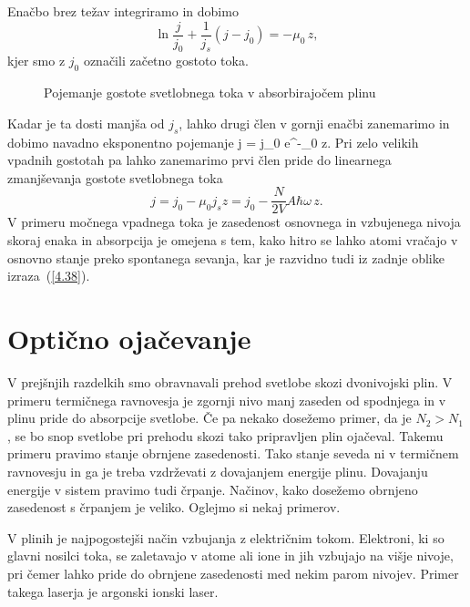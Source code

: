 Enačbo brez težav integriramo in dobimo 
\begin{equation}
\ln\frac{j}{j_{0}}+\frac{1}{j_{s}}(j-j_{0})=-\mu_{0}\, z,\label{4.37}
\end{equation}
kjer smo z $j_{0}$ označili začetno gostoto toka. 

\begin{figure}[h]
\centering
\def\svgwidth{90truemm} 

\caption{Pojemanje gostote svetlobnega toka v absorbirajočem plinu}
\label{fig:abs2}
\end{figure}

Kadar je ta dosti
manjša od $j_{s}$, lahko drugi člen v gornji enačbi zanemarimo in dobimo 
navadno eksponentno pojemanje
\beq
j = j_0 e^{-\mu_0 z}.
\eeq
Pri zelo velikih vpadnih gostotah pa lahko zanemarimo prvi člen pride do 
linearnega zmanjševanja gostote svetlobnega toka
\begin{equation}
j=j_{0}-\mu_{0}j_{s}z=j_{0}-\frac{N}{2V}A\hbar\omega\, z.
\label{4.38}
\end{equation}
V primeru močnega vpadnega toka je zasedenost osnovnega in vzbujenega nivoja skoraj
enaka in absorpcija je omejena s tem, kako hitro se lahko atomi vračajo
v osnovno stanje preko spontanega sevanja, kar je razvidno tudi iz
zadnje oblike izraza~(\ref{4.38}).

\section{Optično ojačevanje}
V prejšnjih razdelkih smo obravnavali prehod svetlobe skozi dvonivojski plin. V primeru
termičnega ravnovesja je zgornji nivo manj zaseden od spodnjega in v plinu pride
do absorpcije svetlobe. Če pa nekako dosežemo primer, da je $N_{2}>N_{1}$, 
se bo snop svetlobe pri prehodu skozi tako pripravljen plin ojačeval. 
Takemu primeru pravimo stanje obrnjene zasedenosti. 
Tako stanje seveda ni v termičnem ravnovesju in ga je treba vzdrževati z dovajanjem 
energije plinu. Dovajanju energije v sistem pravimo tudi črpanje. 
Načinov, kako dosežemo obrnjeno zasedenost s črpanjem je veliko. Oglejmo 
si nekaj primerov. 

V plinih je najpogostejši način vzbujanja z električnim tokom. Elektroni,
ki so glavni nosilci toka, se zaletavajo v atome ali ione in jih vzbujajo
na višje nivoje, pri čemer lahko pride do obrnjene zasedenosti med
nekim parom nivojev. Primer takega laserja je argonski ionski laser. 

